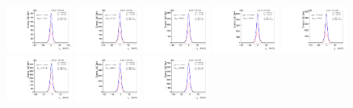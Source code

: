 \begin{figure}[htb]
\ContinuedFloat
\centering
\includegraphics[width=0.19\textwidth]{plots/Appendix_Recoil_Fits/WmmMC_PF_13TeV_2G/pfu1fit_0.pdf}
\includegraphics[width=0.19\textwidth]{plots/Appendix_Recoil_Fits/WmmMC_PF_13TeV_2G/pfu1fit_1.pdf}
\includegraphics[width=0.19\textwidth]{plots/Appendix_Recoil_Fits/WmmMC_PF_13TeV_2G/pfu1fit_2.pdf}
\includegraphics[width=0.19\textwidth]{plots/Appendix_Recoil_Fits/WmmMC_PF_13TeV_2G/pfu1fit_3.pdf}
\includegraphics[width=0.19\textwidth]{plots/Appendix_Recoil_Fits/WmmMC_PF_13TeV_2G/pfu1fit_4.pdf}
\includegraphics[width=0.19\textwidth]{plots/Appendix_Recoil_Fits/WmmMC_PF_13TeV_2G/pfu1fit_5.pdf}
\includegraphics[width=0.19\textwidth]{plots/Appendix_Recoil_Fits/WmmMC_PF_13TeV_2G/pfu1fit_6.pdf}
\includegraphics[width=0.19\textwidth]{plots/Appendix_Recoil_Fits/WmmMC_PF_13TeV_2G/pfu1fit_7.pdf}

\end{figure}
